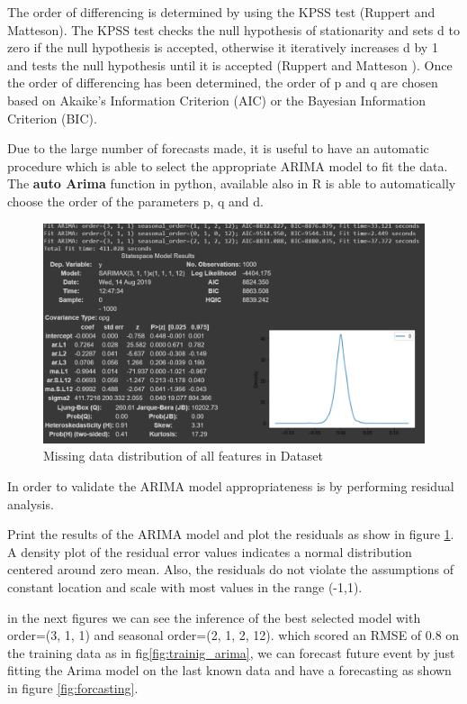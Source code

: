 The order of differencing is determined by using the KPSS test (Ruppert and Matteson\cite{RaM}). The KPSS test checks the null hypothesis of stationarity and sets d to zero if the null hypothesis is accepted, otherwise it iteratively increases d by 1 and tests the null hypothesis until it is accepted (Ruppert and Matteson \cite{RaM}). Once the order of
differencing has been determined, the order of p and q are chosen based on Akaike's Information Criterion (AIC) or the Bayesian Information Criterion (BIC).


Due to the large number of forecasts made, it is useful to have an
automatic procedure which is able to select the appropriate ARIMA model to fit the data. The \textbf{auto Arima} function in python, available also in R  is able to automatically choose the order of the parameters p, q and d.


\begin{figure}[H]
\centering
\includegraphics[scale=.6]{img/arima_degrees.PNG} 
\caption{Missing data distribution of all features in Dataset}
\label{fig:arima_degree}
\end{figure}

In order to validate the ARIMA model appropriateness is by performing residual analysis.

Print the results of the ARIMA model and plot the residuals as show in figure \ref{fig:arima_degree}. A density plot of the residual error values indicates a normal distribution centered around zero mean. Also, the residuals do not violate the assumptions of constant location and scale with most values in the range (-1,1).



in the next figures we can see the inference of  the best selected model with order=(3, 1, 1) and seasonal order=(2, 1, 2, 12). which scored an RMSE of 0.8 on the training data as in fig\ref{fig:trainig_arima}, we can forecast future event by just fitting the Arima model on the last  known data and have a forecasting as shown in figure \ref{fig:forcasting}.  


